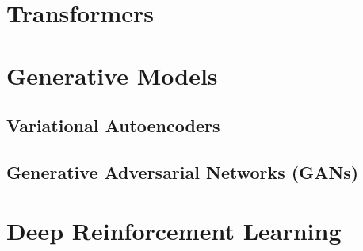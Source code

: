 \documentclass{article}
\theoremstyle{definition}
\theoremstyle{remark}
\theoremstyle{definition}
\begin{document}
\section{Transformers}



\section{Generative Models}

\subsection{Variational Autoencoders}

\subsection{Generative Adversarial Networks (GANs)}



\section{Deep Reinforcement Learning}










\end{document}
